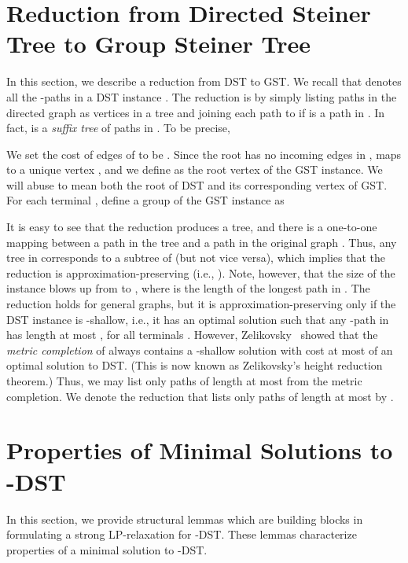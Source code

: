 \documentclass[11pt]{article}
\theoremstyle{definition}
\theoremstyle{remark}
\begin{document}
\section{Reduction from Directed Steiner Tree to Group Steiner Tree}
\label{sec:DST-to-GST}

In this section, we describe a reduction  from DST to GST.
We recall that  denotes all the -paths in a DST instance . 
The reduction is by simply listing paths in the directed graph 
as vertices in a tree  and
joining each path  to  if  is a path in . 
In fact,  is a {\em suffix tree} of paths in .
To be precise,


We set the cost of edges of  to be .
Since the root  has no incoming edges in ,
 maps to a unique vertex , and we define  as
the root vertex of the GST instance.
We will abuse  to mean both the root of DST and 
its corresponding vertex of GST. 
For each terminal , define a group of the GST instance as


It is easy to see that the reduction  produces a tree,
and there is a one-to-one mapping between 
a path in the tree  and a path in
the original graph .
Thus, any tree in  corresponds to a subtree of  
(but not vice versa),
which implies that the reduction  is approximation-preserving 
(i.e., ). 
Note, however, that the size of the instance blows up 
from  to , 
where  is the length of the longest path in .
The reduction holds for general graphs, but
it is approximation-preserving only if the DST instance
is -shallow, i.e., it has an optimal solution  
such that any -path in  has length at most , 
for all terminals .
However, Zelikovsky~\cite{Zelikovsky97,HelvigRZ01} showed
that the {\em metric completion} of  always contains a -shallow 
solution with cost at most  of 
an optimal solution to DST. 
(This is now known as Zelikovsky's height reduction theorem.)
Thus, we may list only paths of length at most  
from the metric completion.
We denote the reduction that lists only paths of length at most  by
.






\section{Properties of Minimal Solutions to -DST}
\label{sec:props-min-solution}

In this section, we provide structural lemmas which are building
blocks in formulating a strong LP-relaxation for -DST. 
These lemmas characterize properties of 
a minimal solution to -DST.
\end{document}

